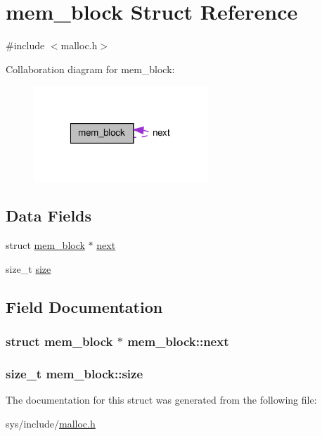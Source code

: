\hypertarget{structmem__block}{\section{mem\-\_\-block Struct Reference}
\label{structmem__block}
}


{\ttfamily \#include $<$malloc.\-h$>$}



Collaboration diagram for mem\-\_\-block\-:\nopagebreak
\begin{figure}[H]
\begin{center}
\leavevmode
\includegraphics[width=186pt]{structmem__block__coll__graph}
\end{center}
\end{figure}
\subsection*{Data Fields}
\begin{DoxyCompactItemize}
\item 
struct \hyperlink{structmem__block}{mem\-\_\-block} $\ast$ \hyperlink{structmem__block_ac3317f1b6603856e265b1ba15c4a99b8}{next}
\item 
size\-\_\-t \hyperlink{structmem__block_a5ff4ee5dcd970bbc4951eb108c5eec4b}{size}
\end{DoxyCompactItemize}


\subsection{Field Documentation}
\hypertarget{structmem__block_ac3317f1b6603856e265b1ba15c4a99b8}{
\subsubsection[{next}]{\setlength{\rightskip}{0pt plus 5cm}struct {\bf mem\-\_\-block} $\ast$ mem\-\_\-block\-::next}}\label{structmem__block_ac3317f1b6603856e265b1ba15c4a99b8}
\hypertarget{structmem__block_a5ff4ee5dcd970bbc4951eb108c5eec4b}{
\subsubsection[{size}]{\setlength{\rightskip}{0pt plus 5cm}size\-\_\-t mem\-\_\-block\-::size}}\label{structmem__block_a5ff4ee5dcd970bbc4951eb108c5eec4b}


The documentation for this struct was generated from the following file\-:\begin{DoxyCompactItemize}
\item 
sys/include/\hyperlink{malloc_8h}{malloc.\-h}\end{DoxyCompactItemize}
